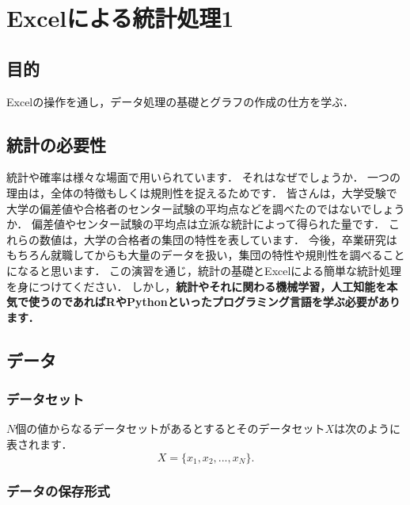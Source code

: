 
\chapter{Excelによる統計処理1}
\setcounter{num_prac}{0}

\section{目的}

Excelの操作を通し，データ処理の基礎とグラフの作成の仕方を学ぶ．

\section{統計の必要性}

統計や確率は様々な場面で用いられています．
それはなぜでしょうか．
一つの理由は，全体の特徴もしくは規則性を捉えるためです．
皆さんは，大学受験で大学の偏差値や合格者のセンター試験の平均点などを調べたのではないでしょうか．
偏差値やセンター試験の平均点は立派な統計によって得られた量です．
これらの数値は，大学の合格者の集団の特性を表しています．
今後，卒業研究はもちろん就職してからも大量のデータを扱い，集団の特性や規則性を調べることになると思います．
この演習を通じ，統計の基礎とExcelによる簡単な統計処理を身につけてください．
しかし，{\bf 統計やそれに関わる機械学習，人工知能を本気で使うのであればRやPythonといったプログラミング言語を学ぶ必要があります．}

\section{データ}
\subsection{データセット}

$N$個の値からなるデータセットがあるとするとそのデータセット$X$は次のように表されます．
\begin{equation}
    \label{eq:2}
    X = \{x_1, x_2, ..., x_N\}.
\end{equation}

\subsection{データの保存形式}

